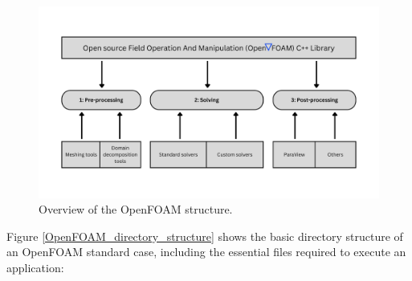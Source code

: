 \documentclass[a5paper]{sapthesis}
\begin{document}
	\begin{figure}{}
		\centering
		\includegraphics[width=1\linewidth]{Figures/OpenFOAM_structure}
		\caption{Overview of the OpenFOAM structure.}
		\label{OpenFOAM_structure}
	\end{figure}
	
	\noindent Figure \ref{OpenFOAM_directory_structure} shows the basic directory structure of an OpenFOAM standard case, including the essential files required to execute an application: 
	
\end{document}
